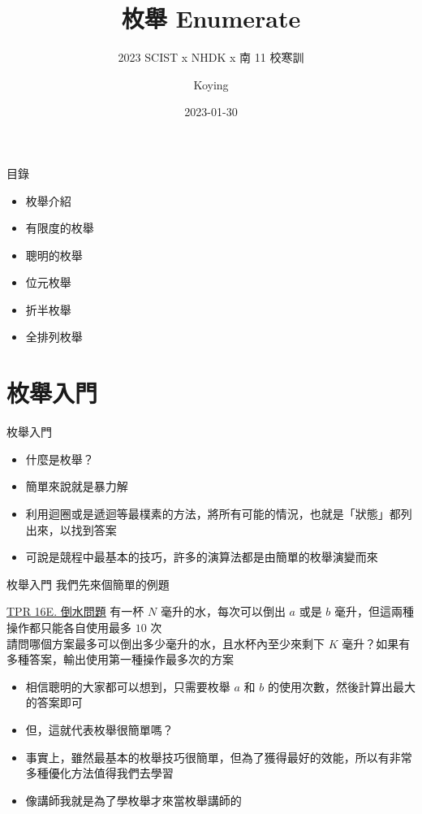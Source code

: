 \documentclass[aspectratio=169]{beamer}
\title{枚舉 Enumerate}
\subtitle{2023 SCIST x NHDK x 南 11 校寒訓}
\author{Koying}
\date{2023-01-30}
\begin{document}
    \begin{frame}
        \titlepage
    \end{frame}


    \begin{frame}{目錄}
        \begin{itemize}
            \item 枚舉介紹
            \item 有限度的枚舉
            \item 聰明的枚舉
            \item 位元枚舉
            \item 折半枚舉
            \item 全排列枚舉
        \end{itemize}
    \end{frame}

    \section{枚舉入門}

    \begin{frame}{枚舉入門}
        \begin{itemize}
            \item<1-> 什麼是枚舉？
            \item<2-> 簡單來說就是暴力解
            \item<3-> 利用迴圈或是遞迴等最樸素的方法，將所有可能的情況，也就是「狀態」都列出來，以找到答案
            \item<3-> 可說是競程中最基本的技巧，許多的演算法都是由簡單的枚舉演變而來
        \end{itemize}
    \end{frame}

    \begin{frame}{枚舉入門}
        我們先來個簡單的例題
        \begin{block}{\href{https://codeforces.com/group/H0qY3QmnOW/contest/366708/problem/E}{TPR 16E. 倒水問題}}
            有一杯 $N$ 毫升的水，每次可以倒出 $a$ 或是 $b$ 毫升，但這兩種操作都只能各自使用最多 $10$ 次 \\
            請問哪個方案最多可以倒出多少毫升的水，且水杯內至少來剩下 $K$ 毫升？如果有多種答案，輸出使用第一種操作最多次的方案
        \end{block}

        \begin{itemize}
            \item<1-> 相信聰明的大家都可以想到，只需要枚舉 $a$ 和 $b$ 的使用次數，然後計算出最大的答案即可
            \item<2-> 但，這就代表枚舉很簡單嗎？
            \item<3-> 事實上，雖然最基本的枚舉技巧很簡單，但為了獲得最好的效能，所以有非常多種優化方法值得我們去學習
            \item<4-> 像講師我就是為了學枚舉才來當枚舉講師的
        \end{itemize}
    \end{frame}
\end{document}
